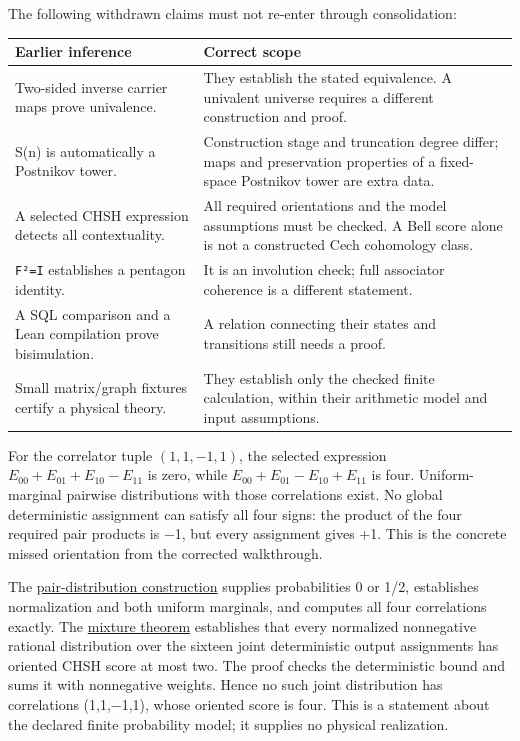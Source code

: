 \documentclass[
  11pt,
]{article}
\begin{document}
The following withdrawn claims must not re-enter through consolidation:

\begin{longtable}[]{@{}
  >{\raggedright\arraybackslash}p{}
  >{\raggedright\arraybackslash}p{}@{}}
\toprule\noalign{}
\begin{minipage}[b]{\linewidth}\raggedright
Earlier inference
\end{minipage} & \begin{minipage}[b]{\linewidth}\raggedright
Correct scope
\end{minipage} \\
\midrule\noalign{}
\endhead
\bottomrule\noalign{}
\endlastfoot
Two-sided inverse carrier maps prove univalence. & They establish the
stated equivalence. A univalent universe requires a different
construction and proof. \\
S(n) is automatically a Postnikov tower. & Construction stage and
truncation degree differ; maps and preservation properties of a
fixed-space Postnikov tower are extra data. \\
A selected CHSH expression detects all contextuality. & All required
orientations and the model assumptions must be checked. A Bell score
alone is not a constructed Cech cohomology class. \\
\texttt{F²=I} establishes a pentagon identity. & It is an involution
check; full associator coherence is a different statement. \\
A SQL comparison and a Lean compilation prove bisimulation. & A relation
connecting their states and transitions still needs a proof. \\
Small matrix/graph fixtures certify a physical theory. & They establish
only the checked finite calculation, within their arithmetic model and
input assumptions. \\
\end{longtable}

For the correlator tuple \((1,1,-1,1)\), the selected expression
\(E_{00}+E_{01}+E_{10}-E_{11}\) is zero, while
\(E_{00}+E_{01}-E_{10}+E_{11}\) is four. Uniform-marginal pairwise
distributions with those correlations exist. No global deterministic
assignment can satisfy all four signs: the product of the four required
pair products is −1, but every assignment gives +1. This is the concrete
missed orientation from the corrected walkthrough.

The \href{lean4/BellPair.lean}{pair-distribution construction} supplies
probabilities 0 or 1/2, establishes normalization and both uniform
marginals, and computes all four correlations exactly. The
\href{lean4/BellMixture.lean}{mixture theorem} establishes that every
normalized nonnegative rational distribution over the sixteen joint
deterministic output assignments has oriented CHSH score at most two.
The proof checks the deterministic bound and sums it with nonnegative
weights. Hence no such joint distribution has correlations (1,1,−1,1),
whose oriented score is four. This is a statement about the declared
finite probability model; it supplies no physical realization.
\end{document}
